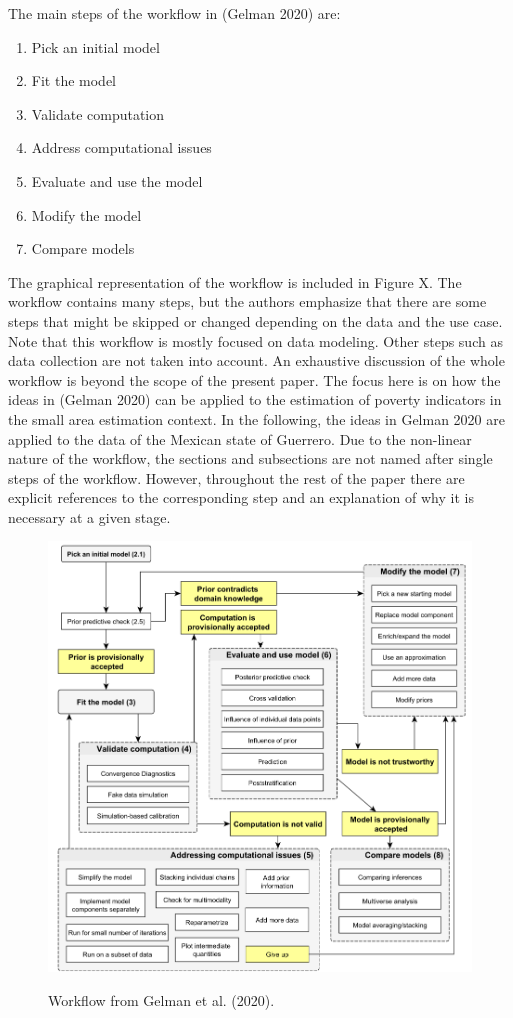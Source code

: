 The main steps of the workflow in (Gelman 2020) are:
\begin{enumerate}
    \setlength\itemsep{0.1em}
    \item Pick an initial model
    \item Fit the model
    \item Validate computation
    \item Address computational issues
    \item Evaluate and use the model
    \item Modify the model
    \item Compare models
\end{enumerate}
The graphical representation of the workflow is included in Figure X.
The workflow contains many steps, but the authors emphasize that there are some steps that might be skipped or changed depending on the data and the use case.
Note that this workflow is mostly focused on data modeling.
Other steps such as data collection are not taken into account.
An exhaustive discussion of the whole workflow is beyond the scope of the present paper.
The focus here is on how the ideas in (Gelman 2020) can be applied to the estimation of poverty indicators in the small area estimation context.
In the following, the ideas in Gelman 2020 are applied to the data of the Mexican state of Guerrero.
Due to the non-linear nature of the workflow, the sections and subsections are not named after single steps of the workflow.
However, throughout the rest of the paper there are explicit references to the corresponding step and an explanation of why it is necessary at a given stage.
\begin{figure}
    \includegraphics[width=16cm]{./graphics/workflow}
    \label{fig:gelman_wf}
    \caption{Workflow from Gelman et al. (2020).}
\end{figure}


